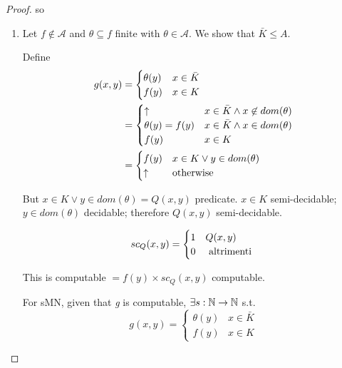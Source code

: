 \begin{theorem}
\begin{proof}
  so
  \begin{enumerate}
    \item
    Let $ f\not\in \mathcal{A}$ and $\theta \subseteq f$ finite with $\theta \in \mathcal{A}$.
    We show that $
    \bar{K}\leq A $.

    Define
    \begin{equation*}
      \begin{aligned}
        g(x,y) & = \begin{cases}
          \theta(y) & x \in \bar{K} \\
          f(y) & x \in K
        \end{cases} \\
               & = \begin{cases}
                 \uparrow & x \in \bar{K} \land x \not\in dom(\theta) \\
                 \theta(y) = f(y) & x \in \bar{K} \land x \in dom(\theta) \\
                 f(y) & x\in K
               \end{cases}\\
               &= \begin{cases}
                 f(y) & x \in K\lor y\in dom(\theta) \\
                 \uparrow & $otherwise $
               \end{cases}
      \end{aligned}
    \end{equation*}

    But $ x\in K\lor y\in dom(\theta) = Q(x,y)$ predicate. $ x\in K $
    semi-decidable; $ y \in dom(\theta) $ decidable; therefore $ Q(x,y) $
    semi-decidable.

    \begin{equation*}
    sc_Q(x,y) = \begin{cases}
        1 & Q(x,y) \\
        0 & $ altrimenti $
      \end{cases}
    \end{equation*}

    This is computable $ = f(y) \times sc_Q(x,y) $ computable.

    For sMN, given that \textit{g} is computable, $ \exists
    s:\mathbb{N}\rightarrow\mathbb{N} $ s.t.
    \begin{equation*}
      g(x,y) = \begin{cases}
        \theta(y) & x \in \bar{K} \\
        f(y) & x \in K
      \end{cases}
    \end{equation*}


\end{enumerate}
\end{proof}
\end{theorem}
